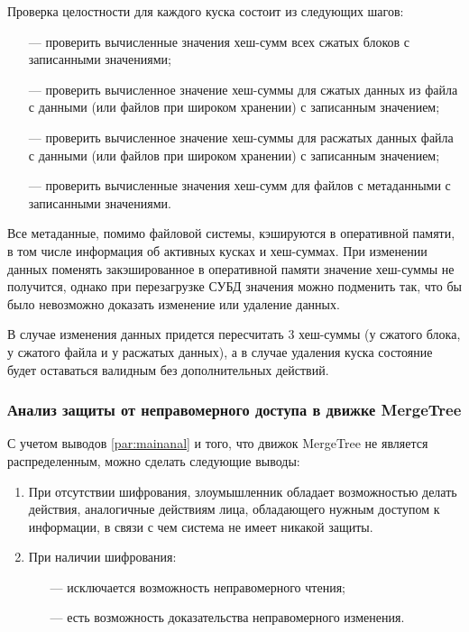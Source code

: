 Проверка целостности для каждого куска состоит из следующих шагов:
\begin{itemize}
	\item [---] проверить вычисленные значения хеш-сумм всех сжатых блоков с записанными значениями;
	\item [---] проверить вычисленное значение хеш-суммы для сжатых данных из файла с данными (или файлов при широком хранении) с записанным значением;
	\item [---] проверить вычисленное значение хеш-суммы для расжатых данных файла с данными (или файлов при широком хранении) с записанным значением;
	\item [---] проверить вычисленные значения хеш-сумм для файлов с метаданными с записанными значениями.
\end{itemize}

Все метаданные, помимо файловой системы, кэшируются в оперативной памяти, в том числе информация об активных кусках и хеш-суммах. При изменении данных поменять закэшированное в оперативной памяти значение хеш-суммы не получится, однако при перезагрузке СУБД значения можно подменить так, что бы было невозможно доказать изменение или удаление данных.

В случае изменения данных придется пересчитать 3 хеш-суммы (у сжатого блока, у сжатого файла и у расжатых данных), а в случае удаления куска состояние будет оставаться валидным без дополнительных действий.

\subsubsection{Анализ защиты от неправомерного доступа в движке MergeTree}

С учетом выводов \ref{par:mainanal} и того, что движок MergeTree не является распределенным, можно сделать следующие выводы:
\begin{enumerate}
	\item При отсутствии шифрования, злоумышленник обладает возможностью делать действия, аналогичные действиям лица, обладающего нужным доступом к информации, в связи с чем система не имеет никакой защиты.
	\item При наличии шифрования:
	\begin{itemize}
		\item [---] исключается возможность неправомерного чтения;
		\item [---] есть возможность доказательства неправомерного изменения.
	\end{itemize}
\end{enumerate}

